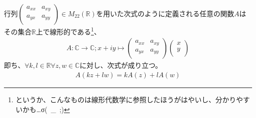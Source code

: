 \documentclass[dvipdfmx]{jsarticle}
\begin{document}
\begin{thm}\label{4.2.8.1} 行列$\begin{pmatrix}
a_{xx} & a_{xy} \\
a_{yx} & a_{yy} \\
\end{pmatrix} \in M_{22}\left( \mathbb{R} \right)$を用いた次式のように定義される任意の関数$A$はその集合$\mathbb{R}$上で線形的である\footnote{というか、こんなものは線形代数学に参照したほうがはやいし、分かりやすいかも…σ(\ \_\ ;)}、
\begin{align*}
A:\mathbb{C} \rightarrow \mathbb{C};x+iy \mapsto \begin{pmatrix}
a_{xx} & a_{xy} \\
a_{yx} & a_{yy} \\
\end{pmatrix}\begin{pmatrix}
x \\
y \\
\end{pmatrix}
\end{align*}
即ち、$\forall k,l \in \mathbb{R}\forall z,w \in \mathbb{C}$に対し、次式が成り立つ。
\begin{align*}
A(kz + lw) = kA(z) + lA(w)
\end{align*}
\end{thm}
\end{document}

